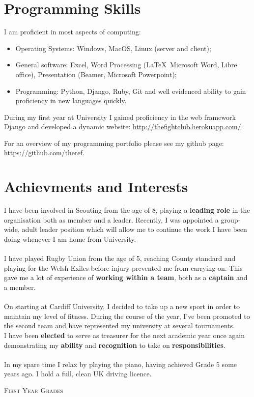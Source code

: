 \documentclass[a4paper]{article}
\begin{document}
\section{Programming Skills}
I am proficient in most aspects of computing:

\begin{itemize}
    \item Operating Systems: Windows, MacOS, Linux (server and client);
    \item General software: Excel, Word Processing (\LaTeX\, Microsoft Word, Libre office), Presentation (Beamer, Microsoft Powerpoint);
    \item Programming: Python, Django, Ruby, Git and well evidenced ability to gain proficiency in new languages quickly.
\end{itemize}

During my first year at University I gained proficiency in the web framework Django and developed a dynamic website: \url{http://thefightclub.herokuapp.com/}.

For an overview of my programming portfolio please see my github page: \url{https://github.com/theref}.
\section{Achievments and Interests}
I have been involved in Scouting from the age of 8, playing a \textbf{leading role} in the organisation both as member and a leader.
Recently, I was appointed a group-wide, adult leader position which will allow me to continue the work I have been doing whenever I am home from University. \\
\\
I have played Rugby Union from the age of 5, reaching County standard and playing for the Welsh Exiles before injury prevented me from carrying on.
This gave me a lot of experience of \textbf{working within a team}, both as a \textbf{captain} and a member. \\
\\
On starting at Cardiff University, I decided to take up a new sport in order to maintain my level of fitness.
During the course of the year, I've been promoted to the second team and have represented my university at several tournaments. \\
I have been \textbf{elected} to serve as treasurer for the next academic year once again demonstrating my \textbf{ability} and \textbf{recognition} to take on \textbf{responsibilities}.\\
\\
In my spare time I relax by playing the piano, having achieved Grade 5 some years ago. I hold a full, clean UK driving licence.
\bigskip
\par{\centering\Large {\textsc{First Year Grades}}
\par}
\end{document}
